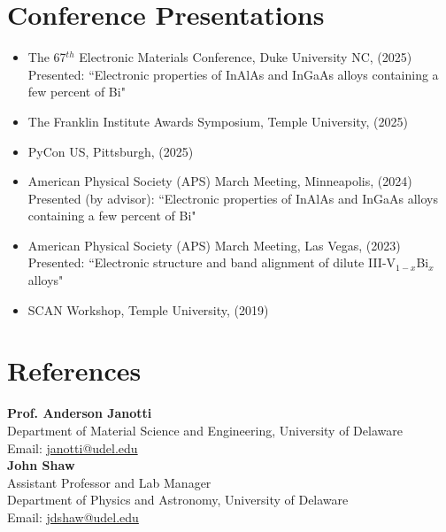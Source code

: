 \documentclass[letter,11pt]{article}
\begin{document}
\section{Conference Presentations}
\begin{itemize}
    \item The 67$^{th}$ Electronic Materials Conference, Duke University NC, (2025) \\
      Presented: ``Electronic properties of InAlAs and InGaAs alloys containing a few percent of Bi"
    \item The Franklin Institute Awards Symposium, Temple University, (2025)
    \item PyCon US, Pittsburgh, (2025)
    \item American Physical Society (APS) March Meeting, Minneapolis, (2024) \\
      Presented (by advisor): ``Electronic properties of InAlAs and InGaAs alloys containing a few percent of Bi"
    \item American Physical Society (APS) March Meeting, Las Vegas, (2023) \\
      Presented: ``Electronic structure and band alignment of dilute III-V$_{1-x}$Bi$_x$ alloys"
    \item SCAN Workshop, Temple University, (2019)
\end{itemize}

\section{References}
\textbf{Prof. Anderson Janotti} \\
Department of Material Science and Engineering, University of Delaware \\
Email: \href{mailto:janotti@udel.edu}{janotti@udel.edu} \\

\noindent\textbf{John Shaw} \\
Assistant Professor and Lab Manager \\
Department of Physics and Astronomy, University of Delaware \\
Email: \href{mailto:jdshaw@udel.edu}{jdshaw@udel.edu}
\end{document}
